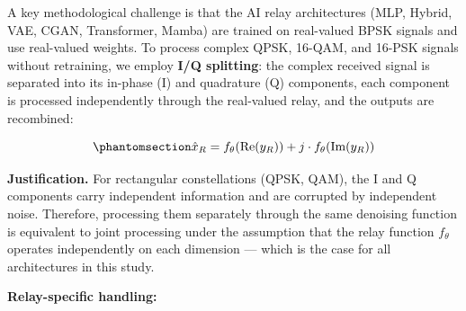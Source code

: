 A key methodological challenge is that the AI relay architectures (MLP, Hybrid, VAE, CGAN, Transformer, Mamba) are trained on real-valued BPSK signals and use real-valued weights. To process complex QPSK, 16-QAM, and 16-PSK signals without retraining, we employ \textbf{I/Q splitting}: the complex received signal is separated into its in-phase (I) and quadrature (Q) components, each component is processed independently through the real-valued relay, and the outputs are recombined:

\begin{equation}\protect\phantomsection\label{eq:iq-splitting}{\hat{x}_R = f_\theta(\text{Re}(y_R)) + j \cdot f_\theta(\text{Im}(y_R))
}\end{equation}

\textbf{Justification.} For rectangular constellations (QPSK, QAM), the I and Q components carry independent information and are corrupted by independent noise. Therefore, processing them separately through the same denoising function is equivalent to joint processing under the assumption that the relay function \(f_\theta\) operates independently on each dimension --- which is the case for all architectures in this study.

\textbf{Relay-specific handling:}

